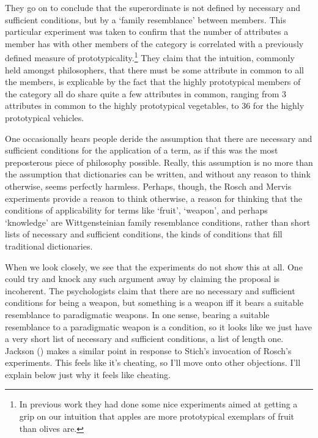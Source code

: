 \documentclass[
  11pt,
  letterpaper,
  DIV=11,
  numbers=noendperiod,
  twoside]{scrartcl}
\begin{document}
They go on to conclude that the superordinate is not defined by
necessary and sufficient conditions, but by a `family resemblance'
between members. This particular experiment was taken to confirm that
the number of attributes a member has with other members of the category
is correlated with a previously defined measure of
prototypicality.\footnote{In previous work they had done some nice
  experiments aimed at getting a grip on our intuition that apples are
  more prototypical exemplars of fruit than olives are.} They claim that
the intuition, commonly held amongst philosophers, that there must be
some attribute in common to all the members, is explicable by the fact
that the highly prototypical members of the category all do share quite
a few attributes in common, ranging from 3 attributes in common to the
highly prototypical vegetables, to 36 for the highly prototypical
vehicles.

One occasionally hears people deride the assumption that there are
necessary and sufficient conditions for the application of a term, as if
this was the most preposterous piece of philosophy possible. Really,
this assumption is no more than the assumption that dictionaries can be
written, and without any reason to think otherwise, seems perfectly
harmless. Perhaps, though, the Rosch and Mervis experiments provide a
reason to think otherwise, a reason for thinking that the conditions of
applicability for terms like `fruit', `weapon', and perhaps `knowledge'
are Wittgensteinian family resemblance conditions, rather than short
lists of necessary and sufficient conditions, the kinds of conditions
that fill traditional dictionaries.

When we look closely, we see that the experiments do not show this at
all. One could try and knock any such argument away by claiming the
proposal is incoherent. The psychologists claim that there are no
necessary and sufficient conditions for being a weapon, but something is
a weapon iff it bears a suitable resemblance to paradigmatic weapons. In
one sense, bearing a suitable resemblance to a paradigmatic weapon is a
condition, so it looks like we just have a very short list of necessary
and sufficient conditions, a list of length one. Jackson
() makes a similar point in response
to Stich's invocation of Rosch's experiments. This feels like it's
cheating, so I'll move onto other objections. I'll explain below just
why it feels like cheating.
\end{document}
